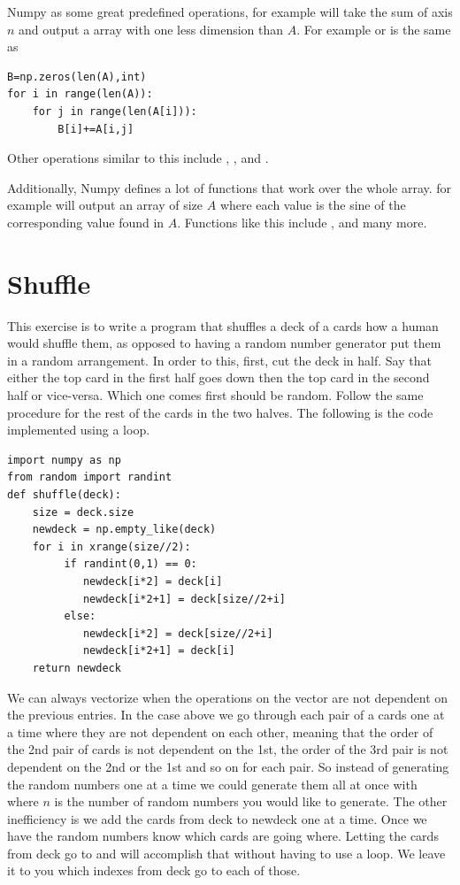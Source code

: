 Numpy as some great predefined operations, for example  will take the sum of axis $n$ and output a array with one less dimension than $A$. For example  or  is the same as
\begin{lstlisting}
B=np.zeros(len(A),int)
for i in range(len(A)):
	for j in range(len(A[i])):
		B[i]+=A[i,j]
\end{lstlisting}
Other operations similar to this include , , and .

Additionally, Numpy defines a lot of functions that work over the whole array. for example  will output an array of size $A$ where each value is the sine of the corresponding value found in $A$. Functions like this include ,  and many more.

\section*{Shuffle}
This exercise is to write a program that shuffles a deck of a cards how a human would shuffle them, as opposed to having a random number generator put them in a random arrangement.
In order to this, first, cut the deck in half.
Say that either the top card in the first half goes down then the top card in the second half or vice-versa.
Which one comes first should be random.
Follow the same procedure for the rest of the cards in the two halves.
The following is the code implemented using a loop.
\begin{lstlisting}
import numpy as np
from random import randint
def shuffle(deck):
    size = deck.size
    newdeck = np.empty_like(deck)
    for i in xrange(size//2):
         if randint(0,1) == 0:
            newdeck[i*2] = deck[i]
            newdeck[i*2+1] = deck[size//2+i]
         else:
            newdeck[i*2] = deck[size//2+i]
            newdeck[i*2+1] = deck[i]
    return newdeck
\end{lstlisting}

We can always vectorize when the operations on the vector are not dependent on the previous entries. In the case above we go through each pair of a cards one at a time where they are not dependent on each other, meaning that the order of the 2nd pair of cards is not dependent on the 1st, the order of the 3rd pair is not dependent on the 2nd or the 1st and so on for each pair. So instead of generating the random numbers one at a time we could generate them all at once with  where $n$ is the number of random numbers you would like to generate. The other inefficiency is we add the cards from deck to newdeck one at a time.  Once we have the random numbers know which cards are going where.  Letting the cards from deck go to  and  will accomplish that without having to use a loop. We leave it to you which indexes from deck go to each of those.

